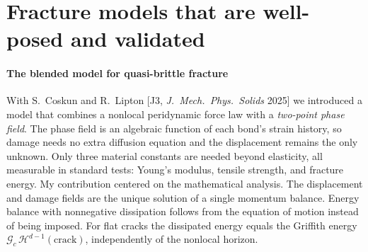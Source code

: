 \documentclass[11pt]{article}
\newcommand{\rc}[1]{\textcolor{accent}{[#1]}}
\begin{document}
\begin{center}
\end{center}
\vspace{-10pt}

\section{Fracture models that are well-posed and validated}

\paragraph{The blended model for quasi-brittle fracture}
With S.~Coskun and R.~Lipton \rc{J3, \emph{J.\ Mech.\ Phys.\ Solids} 2025} we
introduced a model that combines a nonlocal peridynamic force law with a
\emph{two-point phase field}. The phase field is an algebraic function of each
bond's strain history, so damage needs no extra diffusion equation and the
displacement remains the only unknown. Only three material constants are
needed beyond elasticity, all measurable in standard tests: Young's modulus,
tensile strength, and fracture energy. My contribution centered on the
mathematical analysis. The displacement and damage fields are the unique
solution of a single momentum balance. Energy balance with nonnegative
dissipation follows from the equation of motion instead of being imposed. For
flat cracks the dissipated energy equals the Griffith energy
$\mathcal G_c\,\mathcal H^{d-1}(\text{crack})$, independently of the nonlocal
horizon.
\end{document}
